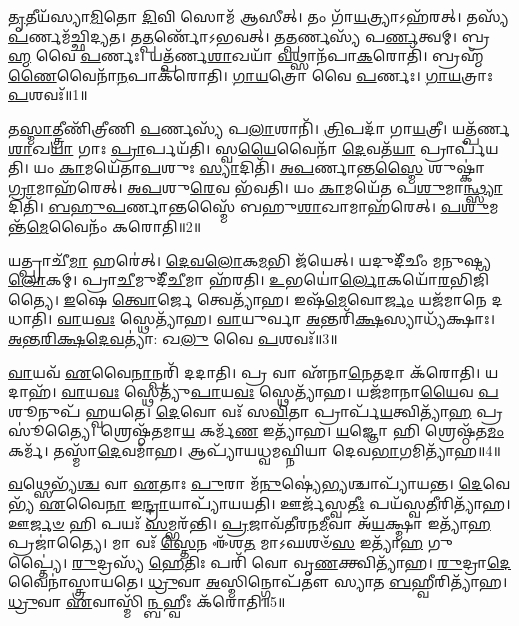\-\ul{𑌤𑍃}\-𑌤𑍀𑌯᳴𑌸𑍍𑌯𑌾\-\ul{𑌮𑌿}\-𑌤𑍋 \ul{𑌦𑌿}\-𑌵𑌿 𑌸𑍋𑌮᳴ 𑌆𑌸𑍀𑌤𑍍।
𑌤𑌂 𑌗𑌾᳴\-\ul{𑌯}\-𑌤𑍍𑌰𑍍𑌯𑌾\-𑌽𑌹᳴𑌰𑌤𑍍।
𑌤𑌸𑍍𑌯᳴ \ul{𑌪}\-𑌰𑍍𑌣𑌮᳴𑌚𑍍𑌛𑌿𑌦𑍍𑌯𑌤।
𑌤\-\ul{𑌤𑍍𑌪}\-𑌰𑍍𑌣𑍋᳴\-𑌽𑌭𑌵𑌤𑍍।
𑌤\-\ul{𑌤𑍍𑌪}\-𑌰𑍍𑌣𑌸𑍍𑌯᳴ 𑌪\-\ul{𑌰𑍍𑌣}\-𑌤𑍍𑌵𑌮𑍍।
𑌬𑍍𑌰\-\ul{𑌹𑍍𑌮} 𑌵𑍈 \ul{𑌪}\-𑌰𑍍𑌣𑌃।
𑌯𑌤𑍍𑌪᳴𑌰𑍍𑌣\-\ul{𑌶𑌾}\-𑌖𑌯𑌾᳴ \ul{𑌵}\-𑌥𑍍𑌸𑌾𑌨᳴𑌪𑌾\-\ul{𑌕}\-𑌰𑍋𑌤𑌿᳴।
𑌬𑍍𑌰𑌹𑍍𑌮᳴\-\ul{𑌣𑍈}\-𑌵𑍈𑌨𑌾᳴\-\ul{𑌨}\-𑌪𑌾𑌕᳴𑌰𑍋𑌤𑌿।
\-\ul{𑌗𑌾}\-\-\ul{𑌯}\-𑌤𑍍𑌰𑍋 𑌵𑍈 \ul{𑌪}\-𑌰𑍍𑌣𑌃।
\-\ul{𑌗𑌾}\-\-\ul{𑌯}\-𑌤𑍍𑌰𑌾𑌃 \ul{𑌪}\-𑌶𑌵𑌃᳴॥1॥

𑌤\-\ul{𑌸𑍍𑌮𑌾}\-𑌤𑍍𑌤𑍍𑌰𑍀𑌣𑌿᳴𑌤𑍍𑌰𑍀𑌣𑌿 \ul{𑌪}\-𑌰𑍍𑌣𑌸𑍍𑌯᳴ 𑌪\-\ul{𑌲𑌾}\-𑌶𑌾𑌨𑌿᳴।
\-\ul{𑌤𑍍𑌰𑌿}\-𑌪𑌦𑌾᳴ 𑌗𑌾\-\ul{𑌯}\-𑌤𑍍𑌰𑍀।
𑌯𑌤𑍍𑌪᳴𑌰𑍍𑌣\-\ul{𑌶𑌾}\-𑌖\-\ul{𑌯𑌾} 𑌗𑌾𑌃 \ul{𑌪𑍍𑌰𑌾}\-𑌰𑍍𑌪𑌯᳴𑌤𑌿।
𑌸𑍍𑌵\-\ul{𑌯𑍈}\-𑌵𑍈𑌨𑌾᳴ \ul{𑌦𑍇}\-𑌵𑌤᳴\-\ul{𑌯𑌾} 𑌪𑍍𑌰𑌾𑌰𑍍𑌪᳴𑌯𑌤𑌿।
𑌯𑌂 \ul{𑌕𑌾}\-𑌮𑌯𑍇᳴𑌤𑌾\-\ul{𑌪}\-𑌶𑍁𑌃 \ul{𑌸𑍍𑌯𑌾}\-𑌦𑌿𑌤𑌿᳴।
\-\ul{𑌅}\-\-\ul{𑌪}\-𑌰𑍍𑌣𑌾𑌨𑍍𑌤\-\ul{𑌸𑍍𑌮𑍈} 𑌶𑍁𑌷𑍍𑌕𑌾॑\-\ul{𑌗𑍍𑌰𑌾}\-𑌮𑌾𑌹᳴𑌰𑍇𑌤𑍍।
\-\ul{𑌅}\-\-\ul{𑌪}\-𑌶𑍁\-\ul{𑌰𑍇}\-𑌵 𑌭᳴𑌵𑌤𑌿।
𑌯𑌂 \ul{𑌕𑌾}\-𑌮𑌯𑍇᳴𑌤 𑌪\-\ul{𑌶𑍁}\-𑌮𑌾\-\ul{𑌨𑍍𑌥𑍍𑌸𑍍𑌯𑌾}\-𑌦𑌿𑌤𑌿᳴।
\-\ul{𑌬}\-\-\ul{𑌹𑍁}\-\-\ul{𑌪}\-𑌰𑍍𑌣𑌾𑌨𑍍𑌤𑌸𑍍𑌮𑍈᳴ 𑌬𑌹𑍁\-\ul{𑌶𑌾}\-𑌖𑌾𑌮𑌾𑌹᳴𑌰𑍇𑌤𑍍।
\-\ul{𑌪}\-\-\ul{𑌶𑍁}\-𑌮𑌨𑍍𑌤᳴\-\ul{𑌮𑍇}\-𑌵𑍈𑌨𑌂᳴ 𑌕𑌰𑍋𑌤𑌿॥2॥

𑌯𑌤𑍍𑌪𑍍𑌰𑌾𑌚𑍀᳴\-\ul{𑌮𑌾} 𑌹𑌰𑍇॑𑌤𑍍।
\-\ul{𑌦𑍇}\-\-\ul{𑌵}\-\-\ul{𑌲𑍋}\-𑌕\-\ul{𑌮}\-𑌭𑌿 𑌜᳴𑌯𑍇𑌤𑍍।
𑌯𑌦𑍁𑌦𑍀᳴𑌚𑍀𑌂 𑌮𑌨𑍁𑌷𑍍𑌯\-\ul{𑌲𑍋}\-𑌕𑌮𑍍।
𑌪𑍍𑌰𑌾\-\ul{𑌚𑍀}\-𑌮𑍁𑌦𑍀᳴\-\ul{𑌚𑍀}\-𑌮𑌾 𑌹᳴𑌰𑌤𑌿।
\-\ul{𑌉}\-𑌭𑌯𑍋॑\-\ul{𑌰𑍍𑌲𑍋}\-𑌕𑌯𑍋᳴\-\ul{𑌰}\-𑌭𑌿\-𑌜𑌿᳴𑌤𑍍𑌯𑍈।
\-\ul{𑌇}\-𑌷𑍇 \ul{𑌤𑍍𑌵𑍋}\-𑌰𑍍𑌜𑍇 𑌤𑍍𑌵𑍇𑌤𑍍𑌯𑌾᳴𑌹।
𑌇𑌷᳴\-\ul{𑌮𑍇}\-𑌵𑍋\-\ul{𑌰𑍍𑌜𑌂} 𑌯𑌜᳴𑌮𑌾𑌨𑍇 𑌦𑌧𑌾𑌤𑌿।
\-\ul{𑌵𑌾}\-𑌯\-\ul{𑌵𑌃} 𑌸𑍍𑌥𑍇𑌤𑍍𑌯𑌾᳴𑌹।
\-\ul{𑌵𑌾}\-𑌯𑍁𑌰𑍍𑌵𑌾 \ul{𑌅}\-𑌨𑍍𑌤𑌰𑌿᳴\-\ul{𑌕𑍍𑌷}\-𑌸𑍍𑌯𑌾𑌧𑍍𑌯᳴𑌕𑍍𑌷𑌾𑌃।
\-\ul{𑌅}\-\-\ul{𑌨𑍍𑌤}\-\-\ul{𑌰𑌿}\-\-\ul{𑌕𑍍𑌷}\-\-\ul{𑌦𑍇}\-\-\ul{𑌵}\-𑌤𑍍𑌯𑌾॑: 𑌖\-\ul{𑌲𑍁} 𑌵𑍈 \ul{𑌪}\-𑌶𑌵𑌃᳴॥3॥

\-\ul{𑌵𑌾}\-𑌯𑌵᳴ \ul{𑌏}\-𑌵𑍈\-\ul{𑌨𑌾}\-𑌨𑍍𑌪𑌰𑌿᳴ 𑌦𑌦𑌾𑌤𑌿।
𑌪𑍍𑌰 𑌵𑌾 𑌏᳴𑌨𑌾\-\ul{𑌨𑍇}\-𑌤𑌦𑌾 𑌕᳴𑌰𑍋𑌤𑌿।
𑌯𑌦𑌾𑌹᳴।
\-\ul{𑌵𑌾}\-𑌯\-\ul{𑌵𑌃} 𑌸𑍍𑌥𑍇𑌤𑍍𑌯𑍁᳴\-\ul{𑌪𑌾}\-𑌯\-\ul{𑌵𑌃} 𑌸𑍍𑌥𑍇𑌤𑍍𑌯𑌾᳴𑌹।
𑌯𑌜᳴𑌮𑌾𑌨𑌾\-\ul{𑌯𑍈}\-𑌵 \ul{𑌪}\-𑌶𑍂𑌨𑍁𑌪᳴ 𑌹𑍍𑌵𑌯𑌤𑍇।
\-\ul{𑌦𑍇}\-𑌵𑍋 𑌵𑌃᳴ 𑌸\-\ul{𑌵𑌿}\-𑌤𑌾 𑌪𑍍𑌰𑌾𑌰𑍍𑌪᳴\-\ul{𑌯}\-𑌤𑍍𑌵𑌿𑌤𑍍𑌯𑌾᳴\-\ul{𑌹} 𑌪𑍍𑌰𑌸𑍂॑𑌤𑍍𑌯𑍈।
𑌶𑍍𑌰𑍇𑌷𑍍𑌠᳴𑌤𑌮𑌾\-\ul{𑌯} 𑌕𑌰𑍍𑌮᳴\-\ul{𑌣} 𑌇𑌤𑍍𑌯𑌾᳴𑌹।
\-\ul{𑌯}\-𑌜𑍍𑌞𑍋 𑌹𑌿 𑌶𑍍𑌰𑍇𑌷𑍍𑌠᳴𑌤\-\ul{𑌮𑌂} 𑌕𑌰𑍍𑌮᳴।
𑌤𑌸𑍍𑌮𑌾᳴\-\ul{𑌦𑍇}\-𑌵𑌮𑌾᳴𑌹।
𑌆𑌪𑍍𑌯𑌾᳴𑌯𑌧𑍍𑌵𑌮𑌘𑍍𑌨𑌿𑌯𑌾 𑌦𑍇𑌵\-\ul{𑌭𑌾}\-𑌗𑌮𑌿𑌤𑍍𑌯𑌾᳴𑌹॥4॥

\-\ul{𑌵}\-𑌥𑍍𑌸𑍇𑌭𑍍𑌯᳴\-\ul{𑌶𑍍𑌚} 𑌵𑌾 \ul{𑌏}\-𑌤𑌾𑌃 \ul{𑌪𑍁}\-𑌰𑌾 𑌮᳴\-\ul{𑌨𑍁}\-𑌷𑍍𑌯𑍇॑\-\ul{𑌭𑍍𑌯}\-𑌶𑍍𑌚𑌾𑌪𑍍𑌯𑌾᳴𑌯𑌨𑍍𑌤।
\-\ul{𑌦𑍇}\-𑌵𑍇𑌭𑍍𑌯᳴ \ul{𑌏}\-𑌵𑍈\-\ul{𑌨𑌾} 𑌇\-\ul{𑌨𑍍𑌦𑍍𑌰𑌾}\-𑌯𑌾𑌪𑍍𑌯𑌾᳴𑌯𑌯𑌤𑌿।
𑌊𑌰𑍍𑌜᳴𑌸𑍍𑌵\-\ul{𑌤𑍀𑌃} 𑌪𑌯᳴𑌸𑍍𑌵\-\ul{𑌤𑍀}\-𑌰𑌿𑌤𑍍𑌯𑌾᳴𑌹।
𑌊\-\ul{𑌰𑍍𑌜}\-\-\ul{𑍞} 𑌹𑌿 𑌪𑌯𑌃᳴ \ul{𑌸}\-𑌮𑍍𑌭𑌰᳴𑌨𑍍𑌤𑌿।
\-\ul{𑌪𑍍𑌰}\-𑌜𑌾𑌵᳴𑌤𑍀𑌰𑌨\-\ul{𑌮𑍀}\-𑌵𑌾 𑌅᳴\-\ul{𑌯}\-𑌕𑍍𑌷𑍍𑌮𑌾 𑌇𑌤𑍍𑌯𑌾᳴\-\ul{𑌹} 𑌪𑍍𑌰𑌜𑌾॑𑌤𑍍𑌯𑍈।
𑌮𑌾 𑌵𑌃᳴ \ul{𑌸𑍍𑌤𑍇}\-𑌨 𑌈᳴𑌶\-\ul{𑌤} 𑌮𑌾𑌽𑌘𑌶𑍞᳴\-\ul{𑌸} 𑌇𑌤𑍍𑌯𑌾᳴\-\ul{𑌹} 𑌗𑍁𑌪𑍍𑌤𑍍𑌯𑍈॑।
\-\ul{𑌰𑍁}\-𑌦𑍍𑌰𑌸𑍍𑌯᳴ \ul{𑌹𑍇}\-𑌤𑌿𑌃 𑌪𑌰𑌿᳴ 𑌵𑍋 𑌵𑍃\-\ul{𑌣}\-𑌕𑍍𑌤𑍍𑌵𑌿𑌤𑍍𑌯𑌾᳴𑌹।
\-\ul{𑌰𑍁}\-𑌦𑍍𑌰𑌾\-\ul{𑌦𑍇}\-𑌵𑍈𑌨𑌾॑𑌸𑍍𑌤𑍍𑌰𑌾𑌯𑌤𑍇।
\-\ul{𑌧𑍍𑌰𑍁}\-𑌵𑌾 \ul{𑌅}\-𑌸𑍍𑌮𑌿𑌨𑍍𑌗𑍋𑌪᳴𑌤𑍗 𑌸𑍍𑌯𑌾𑌤 \ul{𑌬}\-𑌹𑍍𑌵𑍀𑌰𑌿𑌤𑍍𑌯𑌾᳴𑌹।
\-\ul{𑌧𑍍𑌰𑍁}\-𑌵𑌾 \ul{𑌏}\-𑌵𑌾𑌸𑍍𑌮𑌿᳴\-\ul{𑌨𑍍𑌬}\-𑌹𑍍𑌵𑍀𑌃 𑌕᳴𑌰𑍋𑌤𑌿॥5॥

